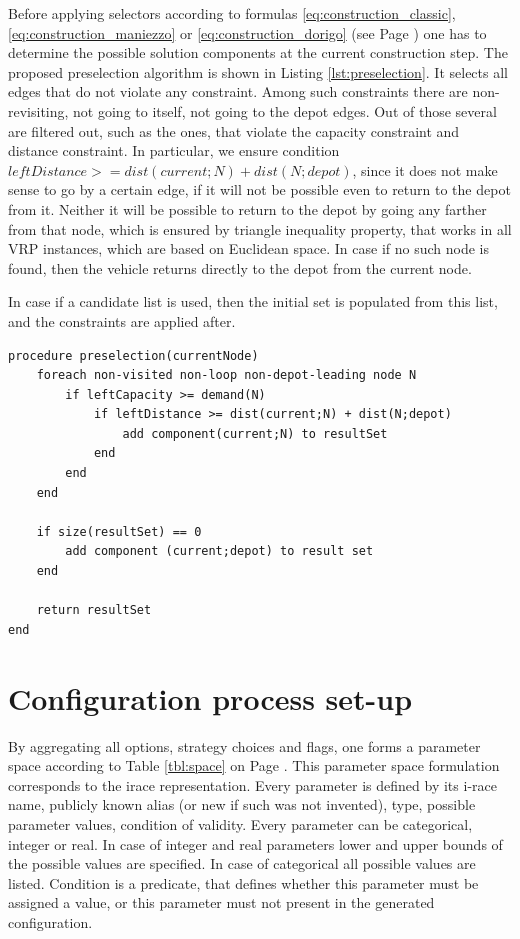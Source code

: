 \documentclass[12pt,a4paper,oneside]{book}
\begin{document}
Before applying selectors according to formulas \eqref{eq:construction_classic}, \eqref{eq:construction_maniezzo} or \eqref{eq:construction_dorigo} (see Page \pageref{eq:construction_classic}) one has to determine the possible solution components at the current construction step. The proposed preselection algorithm is shown in Listing \ref{lst:preselection}. It selects all edges that do not violate any constraint. Among such constraints there are non-revisiting, not going to itself, not going to the depot edges. Out of those several are filtered out, such as the ones, that violate the capacity constraint and distance constraint. In particular, we ensure condition $leftDistance >= dist(current;N) + dist(N;depot)$, since it does not make sense to go by a certain edge, if it will not be possible even to return to the depot from it. Neither it will be possible to return to the depot by going any farther from that node, which is ensured by triangle inequality property, that works in all VRP instances, which are based on Euclidean space. In case if no such node is found, then the vehicle returns directly to the depot from the current node.

In case if a candidate list is used, then the initial set is populated from this list, and the constraints are applied after.

\begin{minipage}[c, breaklines=true]{0.95\textwidth}
\begin{lstlisting}[caption={Solution component preselection pseudo-code}, label={lst:preselection}]
procedure preselection(currentNode)
	foreach non-visited non-loop non-depot-leading node N
		if leftCapacity >= demand(N)
			if leftDistance >= dist(current;N) + dist(N;depot)
				add component(current;N) to resultSet
			end
		end
	end
	
	if size(resultSet) == 0
		add component (current;depot) to result set
	end
		
	return resultSet
end
\end{lstlisting}
\end{minipage}


\section{Configuration process set-up}

By aggregating all options, strategy choices and flags, one forms a parameter space according to Table \ref{tbl:space} on Page \pageref{tbl:space}. This parameter space formulation corresponds to the irace representation. Every parameter is defined by its i-race name, publicly known alias (or new if such was not invented), type, possible parameter values, condition of validity. Every parameter can be categorical, integer or real. In case of integer and real parameters lower and upper bounds of the possible values are specified. In case of categorical all possible values are listed. Condition is a predicate, that defines whether this parameter must be assigned a value, or this parameter must not present in the generated configuration.
\end{document}
